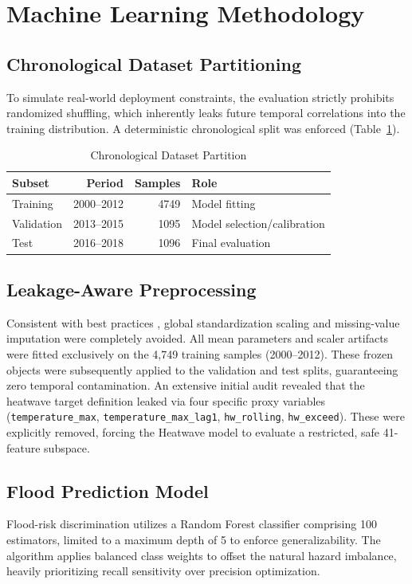 \section{Machine Learning Methodology}
\label{sec:methodology}

\subsection{Chronological Dataset Partitioning}
To simulate real-world deployment constraints, the evaluation strictly prohibits randomized shuffling, which inherently leaks future temporal correlations into the training distribution. A deterministic chronological split was enforced (Table~\ref{tab:split}). 

\begin{table}[htbp]
\caption{Chronological Dataset Partition}
\begin{center}
\begin{tabular}{lrrl}
\toprule
\textbf{Subset} & \textbf{Period} & \textbf{Samples} & \textbf{Role} \\
\midrule
Training & 2000--2012 & 4749 & Model fitting \\
Validation & 2013--2015 & 1095 & Model selection/calibration \\
Test & 2016--2018 & 1096 & Final evaluation \\
\bottomrule
\end{tabular}
\label{tab:split}
\end{center}
\end{table}

\subsection{Leakage-Aware Preprocessing}
Consistent with best practices \cite{Kaufman2012}, global standardization scaling and missing-value imputation were completely avoided. All mean parameters and scaler artifacts were fitted exclusively on the 4,749 training samples (2000--2012). These frozen objects were subsequently applied to the validation and test splits, guaranteeing zero temporal contamination. An extensive initial audit revealed that the heatwave target definition leaked via four specific proxy variables (\texttt{temperature\_max}, \texttt{temperature\_max\_lag1}, \texttt{hw\_rolling}, \texttt{hw\_exceed}). These were explicitly removed, forcing the Heatwave model to evaluate a restricted, safe 41-feature subspace.

\subsection{Flood Prediction Model}
Flood-risk discrimination utilizes a Random Forest classifier \cite{Breiman2001} comprising 100 estimators, limited to a maximum depth of 5 to enforce generalizability. The algorithm applies balanced class weights to offset the natural hazard imbalance, heavily prioritizing recall sensitivity over precision optimization.

